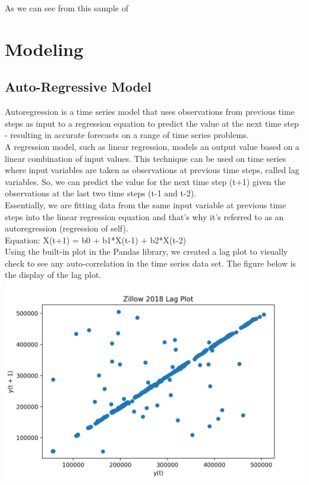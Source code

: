 \documentclass{article}
\begin{document}
	As we can see from this sample of 
	
	\section{Modeling}
	\subsection{Auto-Regressive Model}
	Autoregression is a time series model that uses observations from previous time steps as input to a regression equation to predict the value at the next time step - resulting in accurate forecasts on a range of time series problems. \\
	
	A regression model, such as linear regression, models an output value based on a linear combination of input values. This technique can be used on time series where input variables are taken as observations at previous time steps, called lag variables. So, we can predict the value for the next time step (t+1) given the observations at the last two time steps (t-1 and t-2). \\
	
	Essentially, we are fitting data from the same input variable at previous time steps into the linear regression equation and that's why it's referred to as an autoregression (regression of self). \\
	
	Equation: X(t+1) = b0 + b1*X(t-1) + b2*X(t-2)\\
	
	Using the built-in plot in the Pandas library, we created a lag plot to visually check to see any auto-correlation in the time series data set. The figure below is the display of the lag plot. \\
	
	\includegraphics[scale = 0.2]{../plots/2018/zillow2018_lag.png} \\
	
\end{document}
